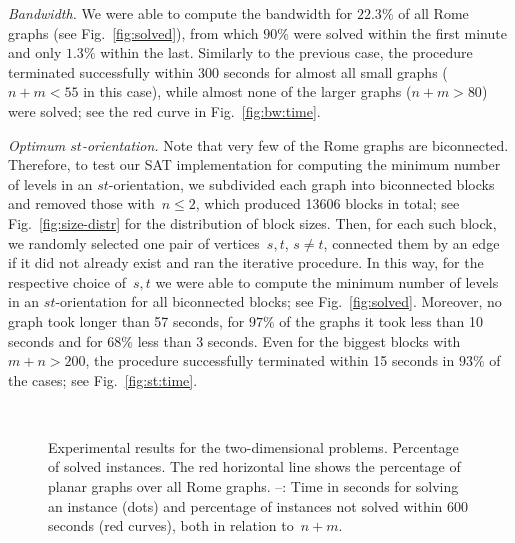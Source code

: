 \documentclass[runningheads]{llncs}
\begin{document}
\smallskip\noindent\textit{Bandwidth.}
We were able to compute the bandwidth for $22.3\%$ of all Rome graphs
(see Fig.~\ref{fig:solved}),
from which $90\%$ were solved within the first minute
and only $1.3\%$ within the last.
Similarly to the previous case, the procedure 
terminated successfully within 300 seconds 
for almost all small graphs ($n+m<55$ in this case), 
while almost none of the larger graphs ($n+m>80$) were solved;
see the red curve in Fig.~\ref{fig:bw:time}.

\smallskip\noindent\textit{Optimum $st$-orientation.}
Note that very few of the Rome graphs are biconnected.
Therefore, to test our SAT implementation 
for computing the minimum number of levels in an $st$-orientation,
we subdivided each graph into biconnected blocks 
and removed those with~$n \leq 2$,
which produced 13606 blocks in total;
see Fig.~\ref{fig:size-distr} for the distribution of block sizes.
Then, for each such block, we randomly selected 
one pair of vertices~$s,t$, $s \neq t$, connected them by an edge if
it did not already exist and ran the iterative procedure.
In this way, for the respective choice of~$s,t$
we were able to compute the minimum number of levels 
in an $st$-orientation for all biconnected blocks; 
see Fig.~\ref{fig:solved}.
Moreover, no graph took longer than 57 seconds,
for $97\%$ of the graphs it took less than 10 seconds
and for $68\%$ less than 3 seconds.
Even for the biggest blocks with $m+n > 200$,
the procedure successfully terminated within 15 seconds 
in $93\%$ of the cases; see Fig.~\ref{fig:st:time}.

\begin{figure}[t]
 \hfill
 \\
 \hfill
 \caption{\small Experimental results for the two-dimensional problems.
  \protect{} 
   Percentage of solved instances. The red horizontal line shows the
   percentage of planar graphs over all Rome graphs.
  \protect{}--\protect{}:  
   Time in seconds for solving an instance (dots)
   and percentage of instances not solved within 600 seconds (red curves), 
   both in relation to~$n+m$.
 }\label{fig:2d}
	\vspace{-2ex}
\end{figure} 
\end{document}
